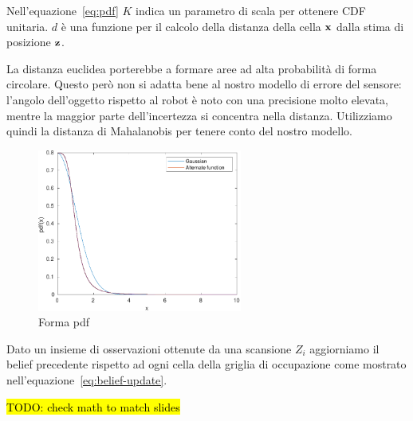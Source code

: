 \documentclass[a4paper]{article}
\begin{document}
	Nell'equazione~\ref{eq:pdf} $K$ indica un parametro di scala per ottenere
	CDF unitaria. $d$ è una funzione per il calcolo della distanza della cella
	$ {\bf x} $ dalla stima di posizione $ {\bf z} $.

	La distanza euclidea porterebbe a formare aree ad alta probabilità di forma
	circolare. Questo però non si adatta bene al nostro modello di errore del
	sensore: l'angolo dell'oggetto rispetto al robot è noto con una precisione
	molto elevata, mentre la maggior parte dell'incertezza si concentra nella
	distanza. Utilizziamo quindi la distanza di Mahalanobis per tenere conto
	del nostro modello.

	\begin{figure}[H]
		\centering
		\includegraphics[width=0.6\textwidth]{./img/pdf_shape.pdf}
		\caption{Forma pdf}
		\label{fig:pdf_shape}
	\end{figure}

	Dato un insieme di osservazioni ottenute da una scansione $ Z_i $ aggiorniamo il belief precedente rispetto ad ogni cella della griglia di occupazione come mostrato nell'equazione~\ref{eq:belief-update}.

	\hl{TODO: check math to match slides}
\end{document}
